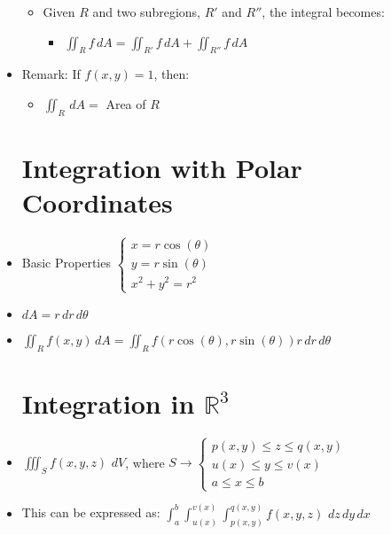 \begin{itemize}
\begin{itemize}
      \item Given $R$ and two subregions, $R'$ and $R''$, the integral becomes:

        \begin{itemize}

          \item $\displaystyle \iint_R f\,dA = \iint_{R'} f\,dA + \iint_{R''} f\,dA$

        \end{itemize}

    \end{itemize}

  \item Remark: If $f(x,y)=1$, then:

    \begin{itemize}

      \item $\displaystyle \iint_R\,dA =$ Area of $R$

    \end{itemize}

    \section{Integration with Polar Coordinates}

  \item Basic Properties $\left\{\begin{array}{c} x=r\cos(\theta)\\y=r\sin(\theta)\\x^2+y^2=r^2  \end{array}$

  \item $dA = r\,dr\,d\theta$

  \item $\displaystyle \iint_R f(x,y)\,dA=\displaystyle \iint_R f(r\cos(\theta), r\sin(\theta))r\,dr\,d\theta$

    \section{Integration in $\mathbb{R}^3$}

  \item $\displaystyle \iiint_S f(x,y,z)\,\,dV$, where $S\rightarrow\left\{\begin{array}{l} p(x,y) \leq z \leq q(x,y)\\ u(x) \leq y \leq v(x)\\ a \leq x \leq b  \end{array}$

    \item This can be expressed as: $\displaystyle \int_a^b\int_{u(x)}^{v(x)}\int_{p(x,y)}^{q(x,y)} f(x,y,z)\,\,dz\,dy\,dx$

\end{itemize}



